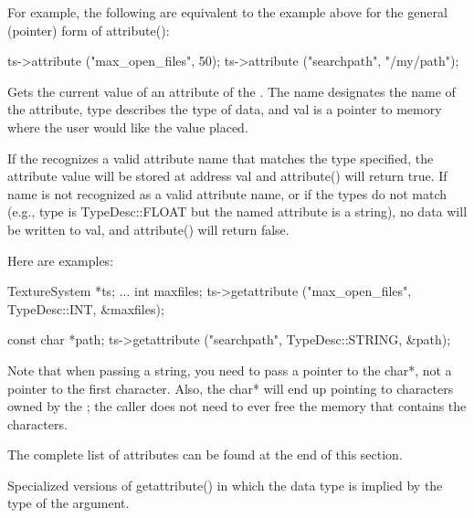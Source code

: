 For example, the following are equivalent to the example above for the
general (pointer) form of {\cf attribute()}:

\begin{code}
      ts->attribute ("max_open_files", 50);
      ts->attribute ("searchpath", "/my/path");
\end{code}

\apiend



Gets the current value of an attribute of the \TextureSystem.
The {\cf name} designates the name of the attribute, {\cf type}
describes the type of data, and {\cf val} is a pointer to memory 
where the user would like the value placed.

If the \TextureSystem recognizes a valid attribute name that matches the
type specified, the attribute value will be stored at address {\cf val}
and {\cf attribute()} will return {\cf true}.  If {\cf name} is not recognized
as a valid attribute name, or if the types do not match (e.g., {\cf
  type} is {\cf TypeDesc::FLOAT} but the named attribute is a string),
no data will be written to {\cf val}, and {\cf attribute()} will return
{\cf false}.

Here are examples:

\begin{code}
      TextureSystem *ts; 
      ...
      int maxfiles;
      ts->getattribute ("max_open_files", TypeDesc::INT, &maxfiles);

      const char *path;
      ts->getattribute ("searchpath", TypeDesc::STRING, &path);
\end{code}

Note that when passing a string, you need to pass a pointer to the {\cf
  char*}, not a pointer to the first character.  Also, the {\cf char*}
will end up pointing to characters owned by the \TextureSystem; the
caller does not need to ever free the memory that contains the
characters.

The complete list of attributes can be found at the end of this section.


\apiend

Specialized versions of {\cf getattribute()} in which the data type is
implied by the type of the argument.

